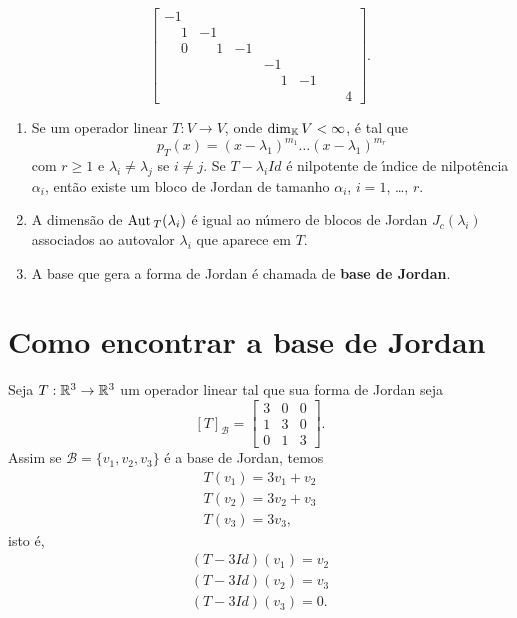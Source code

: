 \begin{exemplo}
\begin{enumerate}[label={\arabic*})]
\begin{solucao}
\[                 \begin{bmatrix}
                    -1\\
                    \phantom{-}1 & -1\\
                    \phantom{-}0 & \phantom{-}1 & -1\\
                    & & & -1 & \\
                    & & & \phantom{-}1 & -1\\
                    & & & & & \phantom{-}4
                \end{bmatrix}.
             \]
        \end{solucao}
    \end{enumerate}
\end{exemplo}

\begin{observacao}
    \begin{enumerate}[label={\arabic*})]
        \item  Se um operador linear $T : V \to V$, onde $\dim_{\mathbb{K}} V < \infty$, \'e tal que
            \[
                p_T(x) = (x - \lambda_1)^{m_1}\dots(x - \lambda_1)^{m_r}
            \]
        com $r \ge 1$ e $\lambda_i \ne \lambda_j$ se $i \ne j$. Se $T - \lambda_i Id$ \'e nilpotente de {\'\i}ndice de nilpot\^encia $\alpha_i$, ent\~ao existe um bloco de Jordan de tamanho $\alpha_i$, $i = 1$, \dots, $r$.
        \item A dimens\~ao de ${\rm Aut\,}_T(\lambda_i)$ \'e igual ao n\'umero de blocos de Jordan $J_c(\lambda_i)$ associados ao autovalor $\lambda_i$ que aparece em $T$.
        \item A base que gera a forma de Jordan \'e chamada de \textbf{base de Jordan}.
    \end{enumerate}
\end{observacao}


\section{Como encontrar a base de Jordan} %
\label{sec:base_de_jordan}

Seja $T : \mathbb{R}^3 \to \mathbb{R}^3$ um operador linear tal que sua forma de Jordan seja
\[
    [T]_\mathcal{B} = \begin{bmatrix}
        3 & 0 & 0\\
        1 & 3 & 0\\
        0 & 1 & 3
    \end{bmatrix}.
\]
Assim se $\mathcal{B} = \{v_1, v_2, v_3\}$ \'e a base de Jordan, temos
\begin{align*}
    T(v_1) = 3v_1 + v_2\\
    T(v_2) = 3v_2 + v_3\\
    T(v_3) = 3v_3,
\end{align*}
isto \'e,
\begin{align*}
    (T- 3Id)(v_1) = v_2\\
    (T - 3Id)(v_2) = v_3\\
    (T - 3Id)(v_3) = 0.
\end{align*}

